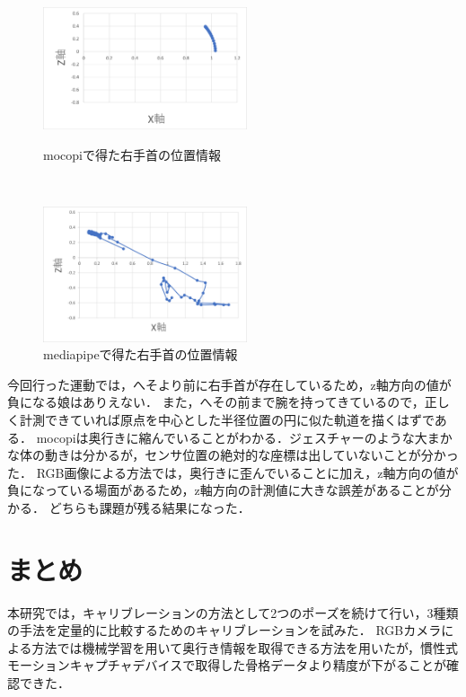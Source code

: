 \documentclass[titlepage]{jarticle}
\begin{document}
\begin{figure}[h]
  \centering
  \begin{minipage}{6cm}
    \centering
    \includegraphics[width=6cm]{img/1_mocopi.png}
    \caption{mocopiで得た右手首の位置情報}
    \label{fig:1_mocopi}
  \end{minipage}\\
  \begin{minipage}{6cm}
    \centering
    \includegraphics[width=6cm]{img/1_media.png}
    \caption{mediapipeで得た右手首の位置情報}
    \label{fig:1_media}
  \end{minipage}
\end{figure}

今回行った運動では，へそより前に右手首が存在しているため，z軸方向の値が負になる娘はありえない．
また，へその前まで腕を持ってきているので，正しく計測できていれば原点を中心とした半径位置の円に似た軌道を描くはずである．
mocopiは奥行きに縮んでいることがわかる．ジェスチャーのような大まかな体の動きは分かるが，センサ位置の絶対的な座標は出していないことが分かった．
RGB画像による方法では，奥行きに歪んでいることに加え，z軸方向の値が負になっている場面があるため，z軸方向の計測値に大きな誤差があることが分かる．
どちらも課題が残る結果になった．
\section{まとめ}
本研究では，キャリブレーションの方法として2つのポーズを続けて行い，3種類の手法を定量的に比較するためのキャリブレーションを試みた．
RGBカメラによる方法では機械学習を用いて奥行き情報を取得できる方法を用いたが，慣性式モーションキャプチャデバイスで取得した骨格データより精度が下がることが確認できた．
\end{document}
